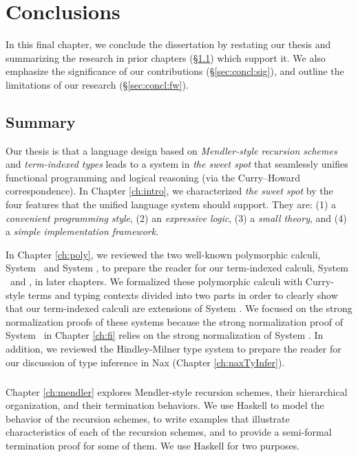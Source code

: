 \chapter{Conclusions}\label{ch:concl} In this final chapter, we conclude the
dissertation by restating our thesis and summarizing the research in prior
chapters (\S\ref{sec:concl:summary}) which support it. We also emphasize
the significance of our contributions (\S\ref{sec:concl:sig}), and outline the
limitations of our research (\S\ref{sec:concl:fw}).

\section{Summary}\label{sec:concl:summary}
Our thesis is that a language design based on
\emph{Mendler-style recursion schemes} and \emph{term-indexed types}
leads  to a system in \emph{the sweet spot} that seamlessly unifies
functional programming and logical reasoning
(via the Curry--Howard correspondence).
In Chapter \ref{ch:intro}, we characterized \emph{the sweet spot} by
the four features that the unified language system should support.
They are: (1) a \emph{convenient programming style},
(2) an \emph{expressive logic}, (3) a \emph{small theory}, and
(4) a \emph{simple implementation framework}.

In Chapter \ref{ch:poly}, we reviewed the two well-known polymorphic calculi,
System \F\ and System \Fw, to prepare the reader for
our term-indexed calculi, System \Fi\ and \Fixi, in later chapters.
We formalized these polymorphic calculi with Curry-style terms and
typing contexts divided into two parts in order to clearly show that
our term-indexed calculi are extensions of System \Fw.
We focused on the strong normalization proofs of these systems
because the strong normalization proof of System \Fi\ in Chapter \ref{ch:fi}
relies on the strong normalization of System \Fw.
In addition, we reviewed the Hindley-Milner type system to prepare
the reader for our discussion of type inference in Nax (Chapter \ref{ch:naxTyInfer}).

\paragraph{}
Chapter \ref{ch:mendler} explores Mendler-style recursion schemes,
their hierarchical organization, and their termination behaviors.
We use Haskell to model the behavior of the recursion schemes, to write
examples that illustrate characteristics of each of the recursion schemes,
and to provide a semi-formal termination proof for some of them.
We use Haskell for two purposes.

